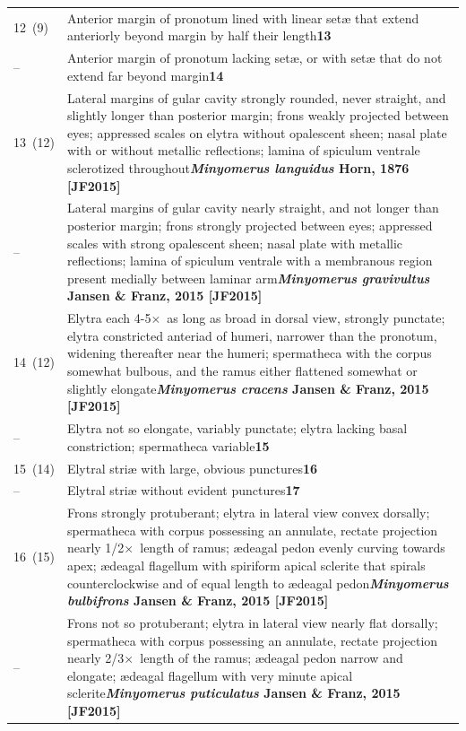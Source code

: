 \documentclass[fleqn,10pt,lineno]{wlpeerj} %
\newcommand{\x}{$\times$~}
\newcommand{\breakfill}{\dotfill\newline\penalty0\hbox{}\nobreak\dotfill}
\begin{document}
\begin{xtabular}{@{}
                p{\dimexpr.1\textwidth-\tabcolsep\relax}
                p{\dimexpr.9\textwidth-\tabcolsep\relax}@{}}
		{12~(9)} & {Anterior margin of pronotum lined with linear set{\ae} that extend anteriorly beyond margin by half their length}{\dotfill}{\textbf{13}}\\
		{--} & {Anterior margin of pronotum lacking set{\ae}, or with set{\ae} that do not extend far beyond margin}{\breakfill}{\textbf{14}}\\
		
		{13~(12)} & {Lateral margins of gular cavity strongly rounded, never straight, and slightly longer than posterior margin; frons weakly projected between eyes; appressed scales on elytra without opalescent sheen; nasal plate with or without metallic reflections; lamina of spiculum ventrale sclerotized throughout}{\dotfill}{\textbf{\textit{Minyomerus languidus} Horn, 1876 [JF2015]}}\\
		{--} & {Lateral margins of gular cavity nearly straight, and not longer than posterior margin; frons strongly projected between eyes; appressed scales with strong opalescent sheen; nasal plate with metallic reflections; lamina of spiculum ventrale with a membranous region present medially between laminar arm}{\dotfill}{\textbf{\textit{Minyomerus gravivultus} Jansen \& Franz, 2015 [JF2015]}}\\
		
		{14~(12)} & {Elytra each 4-5\x as long as broad in dorsal view, strongly punctate; elytra constricted anteriad of humeri, narrower than the pronotum, widening thereafter near the humeri; spermatheca with the corpus somewhat bulbous, and the ramus either flattened somewhat or slightly elongate}{\breakfill}{\textbf{\textit{Minyomerus cracens} Jansen \& Franz, 2015 [JF2015]}}\\
		{--} & {Elytra not so elongate, variably punctate; elytra lacking basal constriction; spermatheca variable}{\dotfill}{\textbf{15}}\\
		
		{15~(14)} & {Elytral stri{\ae} with large, obvious punctures}{\dotfill}{\textbf{16}}\\
		{--} & {Elytral stri{\ae} without evident punctures}{\dotfill}{\textbf{17}}\\
		
		{16~(15)} & {Frons strongly protuberant; elytra in lateral view convex dorsally; spermatheca with corpus possessing an annulate, rectate projection nearly 1/2\x length of ramus; {\ae}deagal pedon evenly curving towards apex; {\ae}deagal flagellum with spiriform apical sclerite that spirals counterclockwise and of equal length to {\ae}deagal pedon}{\breakfill}{\textbf{\textit{Minyomerus bulbifrons} Jansen \& Franz, 2015 [JF2015]}}\\
		{--} & {Frons not so protuberant; elytra in lateral view nearly flat dorsally; spermatheca with corpus possessing an annulate, rectate projection nearly 2/3\x length of the ramus; {\ae}deagal pedon narrow and elongate; {\ae}deagal flagellum with very minute apical sclerite}{\breakfill}{\textbf{\textit{Minyomerus puticulatus} Jansen \& Franz, 2015 [JF2015]}}\\
		

\end{xtabular}
\end{document}
